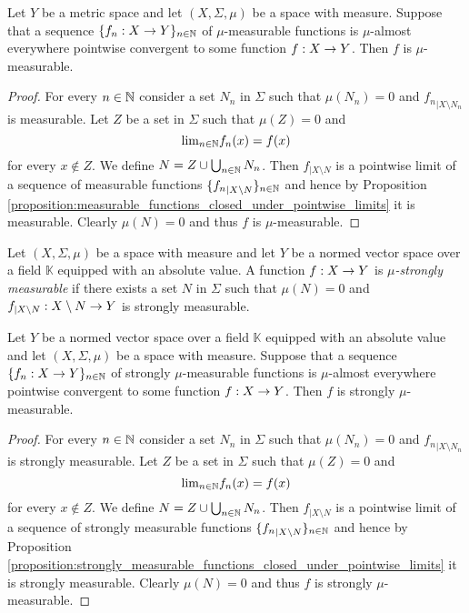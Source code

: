 \begin{corollary}\label{corollary:mu_measurable_closed_under_almost_everywhere_convergence}
Let $Y$ be a metric space and let $(X,\Sigma,\mu)$ be a space with measure. Suppose that a sequence $\{f_n:X\rightarrow Y\}_{n\in {\mathbb N}}$ of $\mu$-measurable functions is $\mu$-almost everywhere pointwise convergent to some function $f:X\rightarrow Y$. Then $f$ is $\mu$-measurable.
\end{corollary}
\begin{proof}
For every $n\in {\mathbb N}$ consider a set $N_n$ in $\Sigma$ such that $\mu(N_n) = 0$ and ${f_n}_{\mid X\setminus N_n}$ is measurable. Let $Z$ be a set in $\Sigma$ such that $\mu(Z) = 0$ and 
$$\mathrm{lim}_{n\in {\mathbb N}}f_n(x) = f(x)$$
for every $x\not \in Z$. We define $N = Z\cup \bigcup_{n\in {\mathbb N}}N_n$. Then $f_{\mid X\setminus N}$ is a pointwise limit of a sequence of measurable functions $\{{f_n}_{\mid X\setminus N}\}_{n\in {\mathbb N}}$ and hence by Proposition \ref{proposition:measurable_functions_closed_under_pointwise_limits} it is measurable. Clearly $\mu(N) = 0$ and thus $f$ is $\mu$-measurable.
\end{proof}

\begin{definition}
Let $(X,\Sigma,\mu)$ be a space with measure and let $Y$ be a normed vector space over a field $\mathbb{K}$ equipped with an absolute value. A function $f:X\rightarrow Y$ is \textit{$\mu$-strongly measurable} if there exists a set $N$ in $\Sigma$ such that $\mu(N) = 0$ and $f_{\mid X\setminus N}:X\setminus N\rightarrow Y$ is strongly measurable.
\end{definition}

\begin{corollary}\label{corollary:mu_strongly_measurable_closed_under_almost_everywhere_convergence}
Let $Y$ be a normed vector space over a field $\mathbb{K}$ equipped with an absolute value and let $(X,\Sigma,\mu)$ be a space with measure. Suppose that a sequence $\{f_n:X\rightarrow Y\}_{n\in {\mathbb N}}$ of strongly $\mu$-measurable functions is $\mu$-almost everywhere pointwise convergent to some function $f:X\rightarrow Y$. Then $f$ is strongly $\mu$-measurable.
\end{corollary}
\begin{proof}
For every $n\in {\mathbb N}$ consider a set $N_n$ in $\Sigma$ such that $\mu(N_n) = 0$ and ${f_n}_{\mid X\setminus N_n}$ is strongly measurable. Let $Z$ be a set in $\Sigma$ such that $\mu(Z) = 0$ and 
$$\mathrm{lim}_{n\in {\mathbb N}}f_n(x) = f(x)$$
for every $x\not \in Z$. We define $N = Z\cup \bigcup_{n\in {\mathbb N}}N_n$. Then $f_{\mid X\setminus N}$ is a pointwise limit of a sequence of strongly measurable functions $\{{f_n}_{\mid X\setminus N}\}_{n\in {\mathbb N}}$ and hence by Proposition \ref{proposition:strongly_measurable_functions_closed_under_pointwise_limits} it is strongly measurable. Clearly $\mu(N) = 0$ and thus $f$ is strongly $\mu$-measurable.
\end{proof}

